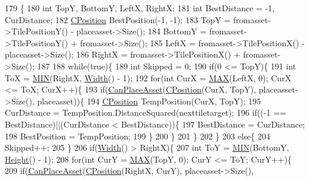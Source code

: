 \begin{DoxyCode}
179                                                                                                            
                                                             \{
180     \textcolor{keywordtype}{int} TopY, BottomY, LeftX, RightX;
181     \textcolor{keywordtype}{int} BestDistance = -1, CurDistance;
182     \hyperlink{classCPosition}{CPosition} BestPosition(-1, -1);
183     TopY = fromasset->TilePositionY() - placeasset->Size();
184     BottomY = fromasset->TilePositionY() + fromasset->Size();
185     LeftX = fromasset->TilePositionX() - placeasset->Size();
186     RightX = fromasset->TilePositionX() + fromasset->Size();
187 
188     \textcolor{keywordflow}{while}(\textcolor{keyword}{true})\{
189         \textcolor{keywordtype}{int} Skipped = 0;
190         \textcolor{keywordflow}{if}(0 <= TopY)\{
191             \textcolor{keywordtype}{int} ToX = \hyperlink{AssetDecoratedMap_8cpp_a3acffbd305ee72dcd4593c0d8af64a4f}{MIN}(RightX, \hyperlink{classCTerrainMap_a34cb754aa9b26e85a73377159f2527d7}{Width}() - 1);
192             \textcolor{keywordflow}{for}(\textcolor{keywordtype}{int} CurX = \hyperlink{AssetDecoratedMap_8cpp_afa99ec4acc4ecb2dc3c2d05da15d0e3f}{MAX}(LeftX, 0); CurX <= ToX; CurX++)\{
193                 \textcolor{keywordflow}{if}(\hyperlink{classCAssetDecoratedMap_ad4baef4b84b066847459e45205c8575c}{CanPlaceAsset}(\hyperlink{classCPosition}{CPosition}(CurX, TopY), placeasset->Size(), 
      placeasset))\{
194                     \hyperlink{classCPosition}{CPosition} TempPosition(CurX, TopY);
195                     CurDistance = TempPosition.DistanceSquared(nexttiletarget);
196                     \textcolor{keywordflow}{if}((-1 == BestDistance)||(CurDistance < BestDistance))\{
197                         BestDistance = CurDistance;
198                         BestPosition = TempPosition;
199                     \}
200                 \}
201             \}
202         \}
203         \textcolor{keywordflow}{else}\{
204             Skipped++;   
205         \}
206         \textcolor{keywordflow}{if}(\hyperlink{classCTerrainMap_a34cb754aa9b26e85a73377159f2527d7}{Width}() > RightX)\{
207             \textcolor{keywordtype}{int} ToY = \hyperlink{AssetDecoratedMap_8cpp_a3acffbd305ee72dcd4593c0d8af64a4f}{MIN}(BottomY, \hyperlink{classCTerrainMap_ae5e4bf6507e0e3e9ac0322b43eed8a7a}{Height}() - 1);
208             \textcolor{keywordflow}{for}(\textcolor{keywordtype}{int} CurY = \hyperlink{AssetDecoratedMap_8cpp_afa99ec4acc4ecb2dc3c2d05da15d0e3f}{MAX}(TopY, 0); CurY <= ToY; CurY++)\{
209                 \textcolor{keywordflow}{if}(\hyperlink{classCAssetDecoratedMap_ad4baef4b84b066847459e45205c8575c}{CanPlaceAsset}(\hyperlink{classCPosition}{CPosition}(RightX, CurY), placeasset->Size(), 

\end{DoxyCode}
